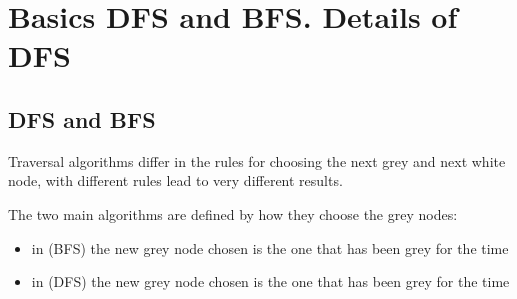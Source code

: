 %
%
%

\chapter{Basics DFS and BFS.  Details of DFS }

\section{DFS and BFS}
\label{sec:BFSDFS}

Traversal algorithms differ in the rules for choosing the next grey and next white node, with  different rules lead
to very different results. 

The two main algorithms are defined by how they choose the grey nodes:
\begin{itemize}
\item in  (BFS) the new grey node chosen is the one
that has been grey for the  time 
\item in  (DFS) the new grey node chosen is the one
that has been grey for the  time
\end{itemize}
 
